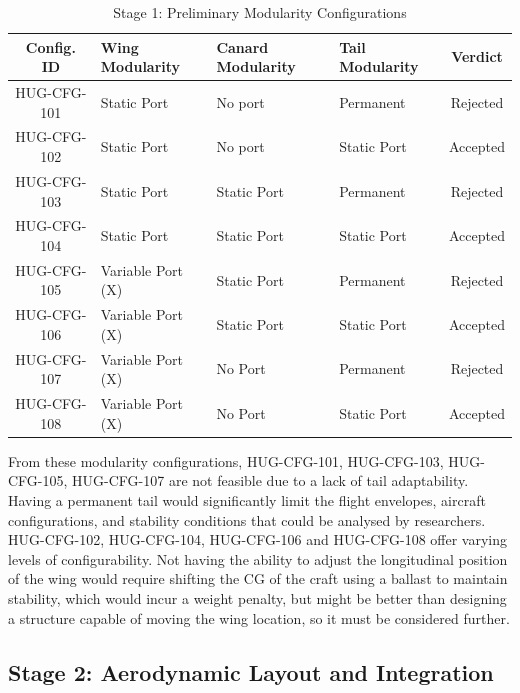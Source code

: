 \begin{table}[H]
    \centering
    \caption{Stage 1: Preliminary Modularity Configurations}
    \label{tab:Modularity_Configurations_Table}
    \renewcommand{\arraystretch}{1.3}
    \begin{tabular}{|c|p{3.2cm}|p{3.2cm}|p{3.2cm}|c|}
        \hline
        \textbf{Config. ID} & \textbf{Wing Modularity} & \textbf{Canard Modularity} & \textbf{Tail Modularity} & \textbf{Verdict} \\
        \hline\hline
        HUG-CFG-101 & Static Port & No port & Permanent & Rejected \\
        \hline
        HUG-CFG-102 & Static Port & No port & Static Port & Accepted \\
        \hline
        HUG-CFG-103 & Static Port & Static Port & Permanent & Rejected \\
        \hline
        HUG-CFG-104 & Static Port & Static Port & Static Port & Accepted \\
        \hline
        HUG-CFG-105 & Variable Port (X) & Static Port & Permanent & Rejected \\
        \hline
        HUG-CFG-106 & Variable Port (X) & Static Port & Static Port & Accepted \\
        \hline
        HUG-CFG-107& Variable Port (X) & No Port & Permanent & Rejected \\
        \hline
        HUG-CFG-108 & Variable Port (X) & No Port & Static Port & Accepted \\
        \hline
    \end{tabular}
\end{table}

From these modularity configurations, HUG-CFG-101, HUG-CFG-103, HUG-CFG-105, HUG-CFG-107 are not feasible due to a lack of tail adaptability. Having a permanent tail would significantly limit the flight envelopes, aircraft configurations, and stability conditions that could be analysed by researchers. HUG-CFG-102, HUG-CFG-104, HUG-CFG-106 and HUG-CFG-108 offer varying levels of configurability. Not having the ability to adjust the longitudinal position of the wing would require shifting the CG of the craft using a ballast to maintain stability, which would incur a weight penalty, but might be better than designing a structure capable of moving the wing location, so it must be considered further.

\subsection{Stage 2: Aerodynamic Layout and Integration}
\label{sec:stage_2_integration}

